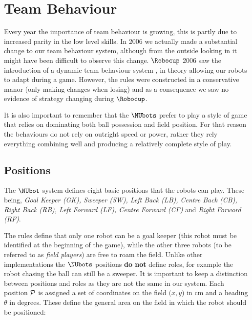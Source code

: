 \newcommand{\Position}{\textnormal{$\mathcal{P}$}\unskip}
\newcommand{\Formation}{\textnormal{$\mathcal{F}$}\unskip}
\newcommand{\FormationDef}{\textnormal{$\mathcal{D}$}\unskip}
\newcommand{\FormationOff}{\textnormal{$\mathcal{O}$}\unskip}
\newcommand{\Highlevel}{\textnormal{$\mathcal{S}$}\unskip}
\newcommand{\distance}{\textnormal{$\textsl{bvrMessage}$}\unskip}
%
\newcommand{\RED}{\textcolor{red}{Red}\unskip}
\newcommand{\BLUE}{\textcolor{blue}{Blue}\unskip}

\section{Team Behaviour}
\label{teamBehaviour}

Every year the importance of team behaviour is growing, this is
partly due to increased parity in the low level skills. In 2006 we actually made a substantial change to our team behaviour system, although from the outside looking in it might have been difficult to observe this change. $\Robocup$ 2006 saw the introduction of a dynamic team behaviour system \cite{QuinlanChalup2006}, in theory allowing our robots to adapt during a game. However, the rules were constructed in a conservative manor (only making changes when losing) and as a consequence we saw no evidence of strategy changing during $\Robocup$.

It is also important to remember that the $\NUbots$ prefer to play a style of game that relies on dominating both ball possession and field position. For that reason the behaviours do not rely on outright speed or power, rather they rely everything combining well and producing a relatively complete style of play.

\subsection{Positions}
\label{subsec:positions}

The $\NUbot$ system defines eight basic positions that the
robots can play. These being, \emph{Goal Keeper (GK), Sweeper (SW),
Left Back (LB), Centre Back (CB), Right Back (RB), Left Forward
(LF), Centre Forward (CF)} and \emph{Right Forward (RF)}.

The rules define that only one robot can be a goal keeper (this
robot must be identified at the beginning of the game), while the
other three robots (to be referred to as \emph{field players}) are
free to roam the field. Unlike other implementations \cite{CMU2004}
the $\NUbots$ positions \textbf{do not} define roles, for example the robot
chasing the ball can still be a sweeper. It is important to keep a
distinction between positions and roles as they are not the same in
our system. Each position $\Position$ is assigned a set of
coordinates on the field $(x,y$) in cm and a heading $\theta$ in degrees. These define the general area on the
field in which the robot should be positioned:

